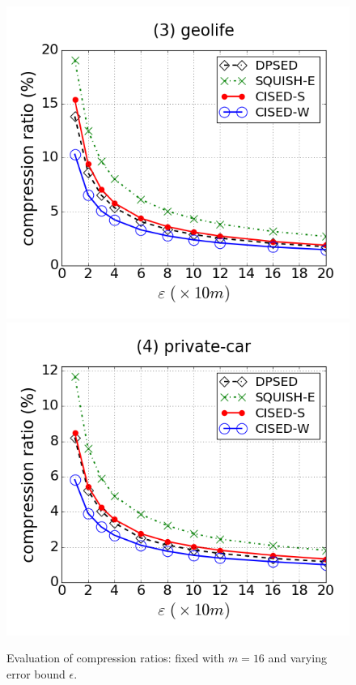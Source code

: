 \begin{figure}[tb!]
\includegraphics[scale = 0.250]{figures/Exp-cr-epsilon-geolife.png}
\includegraphics[scale = 0.250]{figures/Exp-cr-epsilon-private.png}
\vspace{-2ex}
\caption{\small Evaluation of compression ratios: fixed with $m=16$ and varying error bound $\epsilon$.}
\label{fig:cr-m16}
\vspace{-1.0ex}
\end{figure}


